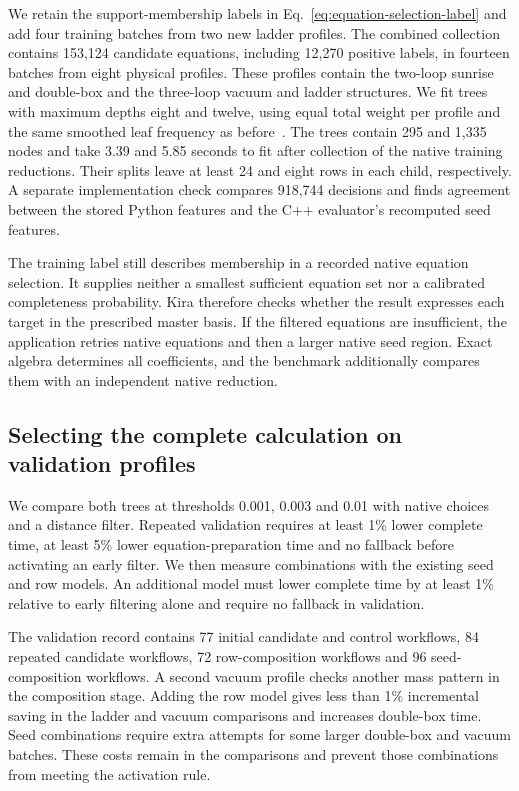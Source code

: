 We retain the support-membership labels in
Eq.~\eqref{eq:equation-selection-label} and add four training batches from
two new ladder profiles. The combined collection contains 153,124 candidate
equations, including 12,270 positive labels, in fourteen batches from
eight physical profiles. These profiles contain the two-loop sunrise and
double-box and the three-loop vacuum and ladder structures. We fit trees
with maximum depths eight and twelve, using equal total weight per profile
and the same smoothed leaf frequency as before~\cite{CART1984}.
The trees contain 295 and 1,335 nodes and take 3.39 and 5.85 seconds to fit
after collection of the native training reductions. Their splits leave at least
24 and eight rows in each child, respectively. A separate implementation
check compares 918,744 decisions and finds agreement between the
stored Python features and the C++ evaluator's recomputed seed features.

The training label still describes membership in a recorded native equation
selection. It supplies neither a smallest sufficient equation set nor a
calibrated completeness probability. Kira therefore checks whether the
result expresses each target in the prescribed master basis. If the
filtered equations are insufficient, the application retries native
equations and then a larger native seed region. Exact algebra determines
all coefficients, and the benchmark additionally compares them with an
independent native reduction.

\subsection{Selecting the complete calculation on validation profiles}
We compare both trees at thresholds 0.001, 0.003 and 0.01 with native
choices and a distance filter. Repeated validation requires at least
1\% lower complete time, at least 5\% lower equation-preparation time
and no fallback before activating an early filter. We then measure
combinations with the existing seed and row models. An additional model
must lower complete time by at least 1\% relative to early filtering
alone and require no fallback in validation.

The validation record contains 77 initial candidate and control workflows,
84 repeated candidate workflows, 72 row-composition workflows and
96 seed-composition workflows. A second vacuum profile checks another
mass pattern in the composition stage. Adding the row model gives less
than 1\% incremental saving in the ladder and vacuum comparisons and
increases double-box time. Seed combinations require extra attempts for
some larger double-box and vacuum batches. These costs remain in the
comparisons and prevent those combinations from meeting the activation rule.


